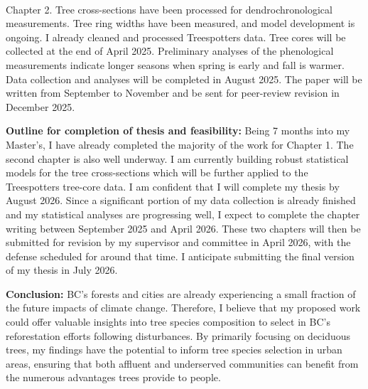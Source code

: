 \documentclass[11pt,letter]{article}
\begin{document}
\\
Chapter 2. Tree cross-sections have been processed for dendrochronological measurements. Tree ring widths have been measured, and model development is ongoing. I already cleaned and processed Treespotters data. Tree cores will be collected at the end of April  2025. Preliminary analyses of the phenological measurements indicate longer seasons when spring is early and fall is warmer. Data collection and analyses will be completed in August 2025. The paper will be written from September to November and be sent for peer-review revision in December 2025.

\textbf{Outline for completion of thesis and feasibility:} Being 7 months into my Master’s, I have already completed the majority of the work for Chapter 1. The second chapter is also well underway. I am currently building robust statistical models for the tree cross-sections which will be further applied to the Treespotters tree-core data. 
I am confident that I will complete my thesis by August 2026. Since a significant portion of my data collection is already finished and my statistical analyses are progressing well, I expect to complete the chapter writing between September 2025 and April 2026. These two chapters will then be submitted for revision by my supervisor and committee in April 2026, with the defense scheduled for around that time. I anticipate submitting the final version of my thesis in July 2026.

\textbf{Conclusion:} BC’s forests and cities are already experiencing a small fraction of the future impacts of climate change. Therefore, I believe that my proposed work could offer valuable insights into tree species composition to select in BC's reforestation efforts following disturbances. By primarily focusing on deciduous trees, my findings have the potential to inform tree species selection in urban areas, ensuring that both affluent and underserved communities can benefit from the numerous advantages trees provide to people.

\end{document}
